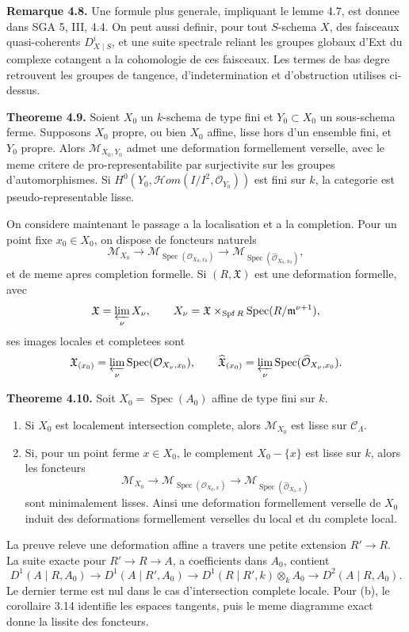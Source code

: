 \documentclass[11pt]{article}
\providecommand{\Spec}{\operatorname{Spec}}
\providecommand{\Spf}{\operatorname{Spf}}
\begin{document}
\textbf{Remarque 4.8.} Une formule plus generale, impliquant le lemme 4.7, est donnee dans SGA 5, III, 4.4. On peut aussi definir, pour tout \(S\)-schema \(X\), des faisceaux quasi-coherents \(D^i_{X\mid S}\), et une suite spectrale reliant les groupes globaux d'Ext du complexe cotangent a la cohomologie de ces faisceaux. Les termes de bas degre retrouvent les groupes de tangence, d'indetermination et d'obstruction utilises ci-dessus.

\textbf{Theoreme 4.9.} Soient \(X_0\) un \(k\)-schema de type fini et \(Y_0\subset X_0\) un sous-schema ferme. Supposons \(X_0\) propre, ou bien \(X_0\) affine, lisse hors d'un ensemble fini, et \(Y_0\) propre. Alors \(\mathcal M_{X_0,Y_0}\) admet une deformation formellement verselle, avec le meme critere de pro-representabilite par surjectivite sur les groupes d'automorphismes. Si \(H^0(Y_0,\mathcal Hom(I/I^2,\mathcal O_{Y_0}))\) est fini sur \(k\), la categorie est pseudo-representable lisse.


On considere maintenant le passage a la localisation et a la completion. Pour un point fixe \(x_0\in X_0\), on dispose de foncteurs naturels
\[
 \mathcal M_{X_0}\longrightarrow
 \mathcal M_{\Spec(\mathcal O_{X_0,x_0})}
 \longrightarrow
 \mathcal M_{\Spec(\widehat{\mathcal O}_{X_0,x_0})},
\]
et de meme apres completion formelle. Si \((R,\mathfrak X)\) est une deformation formelle, avec
\[
 \mathfrak X=\varprojlim_\nu X_\nu,
 \qquad X_\nu=\mathfrak X\times_{\Spf R}\Spec(R/\mathfrak m^{\nu+1}),
\]
ses images locales et completees sont
\[
 \mathfrak X_{(x_0)}=\varprojlim_\nu\Spec(\mathcal O_{X_\nu,x_0}),
 \qquad
 \widehat{\mathfrak X}_{(x_0)}=\varprojlim_\nu\Spec(\widehat{\mathcal O}_{X_\nu,x_0}).
\]

\textbf{Theoreme 4.10.} Soit \(X_0=\Spec(A_0)\) affine de type fini sur \(k\).
\begin{enumerate}[label=(\alph*)]
\item Si \(X_0\) est localement intersection complete, alors \(\mathcal M_{X_0}\) est lisse sur \(\mathcal C_\Lambda\).
\item Si, pour un point ferme \(x\in X_0\), le complement \(X_0-\{x\}\) est lisse sur \(k\), alors les foncteurs
\[
 \mathcal M_{X_0}\to\mathcal M_{\Spec(\mathcal O_{X_0,x})}
 \to\mathcal M_{\Spec(\widehat{\mathcal O}_{X_0,x})}
\]
sont minimalement lisses. Ainsi une deformation formellement verselle de \(X_0\) induit des deformations formellement verselles du local et du complete local.
\end{enumerate}
La preuve releve une deformation affine a travers une petite extension \(R'\to R\). La suite exacte pour \(R'\to R\to A\), a coefficients dans \(A_0\), contient
\[
D^1(A\mid R,A_0)\to D^1(A\mid R',A_0)\to
D^1(R\mid R',k)\otimes_kA_0\to D^2(A\mid R,A_0).
\]
Le dernier terme est nul dans le cas d'intersection complete locale. Pour (b), le corollaire 3.14 identifie les espaces tangents, puis le meme diagramme exact donne la lissite des foncteurs.
\end{document}
